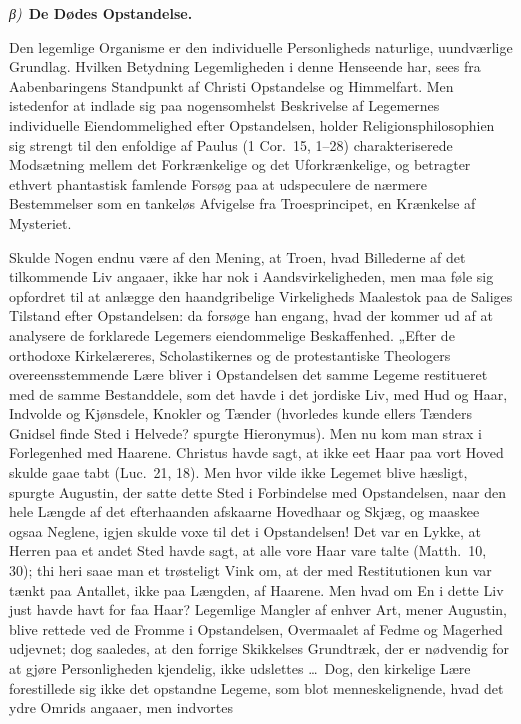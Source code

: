 \documentclass[12pt]{book}
\newcommand{\greekrun}[2]{%
  \medskip\begin{center}{\itshape #1)}\ {\bfseries #2}\end{center}\medskip}
\begin{document}
\greekrun{β}{De Dødes Opstandelse.}

Den legemlige Organisme er den individuelle Personligheds naturlige,
uundværlige Grundlag. Hvilken Betydning Legemligheden i denne
Henseende har, sees fra Aabenbaringens Standpunkt af Christi
Opstandelse og Himmelfart. Men istedenfor at indlade sig paa
nogensomhelst Beskrivelse af Legemernes individuelle Eiendommelighed
efter Opstandelsen, holder Religionsphilosophien sig strengt til den
enfoldige af Paulus (1 Cor.\ 15, 1--28) charakteriserede Modsætning
mellem det Forkrænkelige og det Uforkrænkelige, og betragter ethvert
phantastisk famlende Forsøg paa at udspeculere de nærmere
Bestemmelser som en tankeløs Afvigelse fra Troesprincipet, en
Krænkelse af Mysteriet.

Skulde Nogen endnu være af den Mening, at Troen, hvad Billederne af
det tilkommende Liv angaaer, ikke har nok i Aandsvirkeligheden, men
maa føle sig opfordret til at anlægge den haandgribelige
Virkeligheds Maalestok paa de Saliges Tilstand efter Opstandelsen:
da forsøge han engang, hvad der kommer ud af at analysere de
forklarede Legemers eiendommelige Beskaffenhed. „Efter de orthodoxe
Kirkelæreres, Scholastikernes og de protestantiske Theologers
overeensstemmende Lære bliver i Opstandelsen det samme Legeme
restitueret med de samme Bestanddele, som det havde i det jordiske
Liv, med Hud og Haar, Indvolde og Kjønsdele, Knokler og Tænder
(hvorledes kunde ellers Tænders Gnidsel finde Sted i Helvede?
spurgte Hieronymus). Men nu kom man strax i Forlegenhed med
Haarene. Christus havde sagt, at ikke eet Haar paa vort Hoved skulde
gaae tabt (Luc.\ 21, 18). Men hvor vilde ikke Legemet blive hæsligt,
spurgte Augustin, der satte dette Sted i Forbindelse med
Opstandelsen, naar den hele Længde af det efterhaanden afskaarne
Hovedhaar og Skjæg, og maaskee ogsaa Neglene, igjen skulde voxe til
det i Opstandelsen! Det var en Lykke, at Herren paa et andet Sted
havde sagt, at alle vore Haar vare talte (Matth.\ 10, 30); thi heri
saae man et trøsteligt Vink om, at der med Restitutionen kun var
tænkt paa Antallet, ikke paa Længden, af Haarene. Men hvad om En i
dette Liv just havde havt for faa Haar? Legemlige Mangler af enhver
Art, mener Augustin, blive rettede ved de Fromme i Opstandelsen,
Overmaalet af Fedme og Magerhed udjevnet; dog saaledes, at den
forrige Skikkelses Grundtræk, der er nødvendig for at gjøre
Personligheden kjendelig, ikke udslettes \dots\ Dog, den kirkelige
Lære forestillede sig ikke det opstandne Legeme, som blot
menneskelignende, hvad det ydre Omrids angaaer, men indvortes
\end{document}
